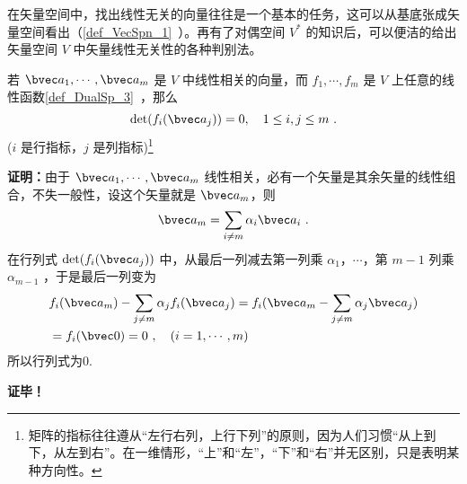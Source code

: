
\begin{issues}
\end{issues}

在矢量空间中，找出线性无关的向量往往是一个基本的任务，这可以从基底张成矢量空间看出（\autoref{def_VecSpn_1}~）。再有了对偶空间 $V^*$ 的知识后，可以便洁的给出矢量空间 $V$ 中矢量线性无关性的各种判别法。
\begin{lemma}{}\label{lem_LinInD_1}
若 $\bvec a_1,\cdots,\bvec a_m$ 是 $V$ 中线性相关的向量，而 $f_1,\cdots,f_m$ 是 $V$ 上任意的线性函数\autoref{def_DualSp_3}~，那么
\begin{equation}
\det(f_i(\bvec a_j))=0,\quad 1\leq i,j\leq m~.
\end{equation}
($i$ 是行指标，$j$ 是列指标)\footnote{矩阵的指标往往遵从“左行右列，上行下列”的原则，因为人们习惯“从上到下，从左到右”。在一维情形，“上”和“左”，“下”和“右”并无区别，只是表明某种方向性。}
\end{lemma}
\textbf{证明：}由于 $\bvec a_1,\cdots,\bvec a_m$ 线性相关，必有一个矢量是其余矢量的线性组合，不失一般性，设这个矢量就是 $\bvec a_m$，则
\begin{equation}
\bvec a_m=\sum_{i\neq m}\alpha_i\bvec a_i~.
\end{equation}
在行列式 $\det(f_i(\bvec a_j))$ 中，从最后一列减去第一列乘 $\alpha_1$，$\cdots$，第 $m-1$ 列乘 $\alpha_{m-1}$ ，于是最后一列变为
\begin{equation}
\begin{aligned}
&f_i(\bvec a_m)-\sum_{j\neq m}\alpha_j f_i(\bvec a_j)=f_i(\bvec a_m-\sum_{j\neq m}\alpha_{j}\bvec a_j)\\
&=f_i(\bvec 0)=0~,\quad (i=1,\cdots ,m)
\end{aligned}
\end{equation}
所以行列式为0.

\textbf{证毕！}

